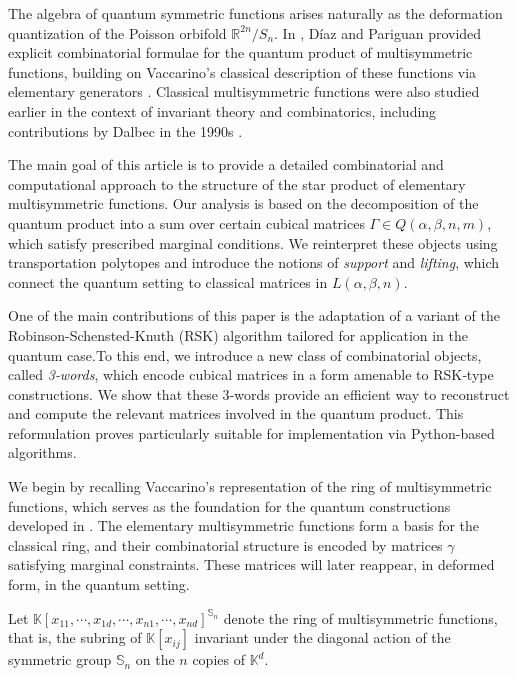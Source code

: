 \documentclass[11pt]{article}
\begin{document}
The algebra of quantum symmetric functions arises naturally as the deformation quantization of the Poisson orbifold \(\mathbb{R}^{2n}/S_n\). In \cite{DP2}, Díaz and Pariguan provided explicit combinatorial formulae for the quantum product of multisymmetric functions, building on Vaccarino’s classical description of these functions via elementary generators \cite{Vac}. Classical multisymmetric functions were also studied earlier in the context of invariant theory and combinatorics, including contributions by Dalbec in the 1990s \cite{Dalbec}.

The main goal of this article is to provide a detailed combinatorial and computational approach to the structure of the star product of elementary multisymmetric functions. Our analysis is based on the decomposition of the quantum product into a sum over certain cubical matrices \(\Gamma \in Q(\alpha, \beta, n, m)\), which satisfy prescribed marginal conditions. We reinterpret these objects using  transportation polytopes and introduce the notions of \emph{support} and \emph{lifting}, which connect the quantum setting to classical matrices in \(L(\alpha, \beta, n)\).

One of the main contributions of this paper is the adaptation of a variant of the Robinson-Schensted-Knuth (RSK) algorithm tailored for application in the quantum case.To this end, we introduce a new class of combinatorial objects, called \emph{3‑words}, which encode cubical matrices in a form amenable to RSK‑type constructions. We show that these 3‑words provide an efficient way to reconstruct and compute the relevant matrices involved in the quantum product. This reformulation proves particularly suitable for implementation via Python-based algorithms.

We begin by recalling Vaccarino’s representation of the ring of multisymmetric functions, which serves as the foundation for the quantum constructions developed in \cite{DP2}. The elementary multisymmetric functions form a basis for the classical ring, and their combinatorial structure is encoded by matrices $\gamma$ satisfying marginal constraints. These matrices will later reappear, in deformed form, in the quantum setting.

Let $\mathbb{K}[x_{11},\cdots, x_{1d},\cdots,x_{n1},\cdots, x_{nd} ]^{\mathbb{S}_n}$ denote the ring of multisymmetric functions, that is, the subring of $\mathbb{K}[x_{ij}]$ invariant under the diagonal action of the symmetric group $\mathbb{S}_n$ on the $n$ copies of $\mathbb{K}^d$. 
\end{document}
